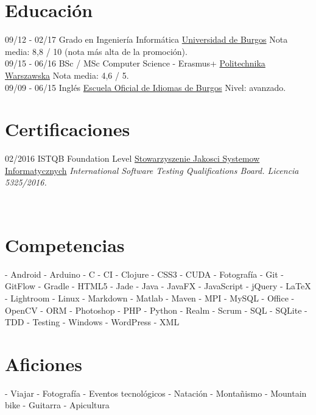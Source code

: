 \documentclass[]{friggeri-cv}
\begin{document}
\section{Educación}
\begin{entrylist}
  \entry
    {09/12 - 02/17}
    {Grado en Ingeniería Informática}
    {\href{http://wwww.ubu.es/}{Universidad de Burgos}}
    {Nota media: 8,8 / 10 (nota más alta de la promoción).\\}
  \entry
    {09/15 - 06/16}
    {BSc / MSc Computer Science - Erasmus+}
    {\href{https://www.pw.edu.pl/}{Politechnika Warszawska}}
    {Nota media: 4,6 / 5.\\}
  \entry
    {09/09 - 06/15}
    {Inglés}
    {\href{http://eoiburgos.centros.educa.jcyl.es/}{Escuela Oficial de Idiomas de Burgos}}
    {Nivel: avanzado.\\}
\end{entrylist}

\section{Certificaciones}
\begin{entrylist}
  \entry
    {02/2016}
    {ISTQB Foundation Level}
    {\href{http://sjsi.org/}{Stowarzyszenie Jakosci Systemow Informatycznych}}
    {\emph{International Software Testing Qualifications Board. Licencia 5325/2016.}}
\end{entrylist}

\newpage

\begin{aside}
~
~
~
  \section{\vspace{0.49cm}Competencias}
    - Android
    - Arduino
    - C
    - CI    
    - Clojure
    - CSS3
    - CUDA
    - Fotografía
    - Git
    - GitFlow   
    - Gradle
    - HTML5
    - Jade
    - Java
    - JavaFX
    - JavaScript
    - jQuery
    - \LaTeX
    - Lightroom
    - Linux
    - Markdown
    - Matlab
    - Maven
    - MPI
    - MySQL
    - Office
    - OpenCV
    - ORM
    - Photoshop
    - PHP
    - Python
    - Realm
    - Scrum
    - SQL
    - SQLite
    - TDD
    - Testing
    - Windows
    - WordPress
    - XML
    ~
  \section{Aficiones}
    - Viajar
    - Fotografía
    - Eventos tecnológicos
    - Natación
    - Montañismo
    - Mountain bike
    - Guitarra
    - Apicultura
    ~
\end{aside}
\end{document}
